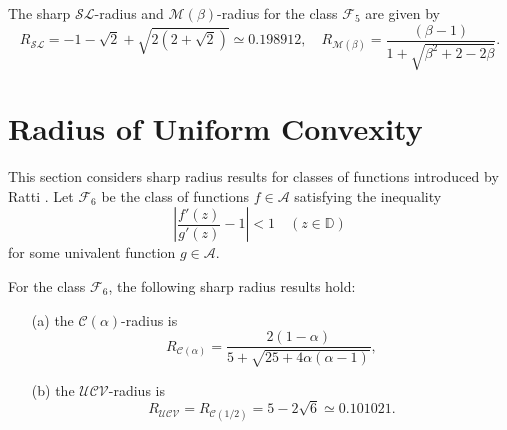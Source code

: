 \documentclass{amsart}
\begin{document}
\begin{conjecture}  \label{i11}The sharp ${\mathcal{SL}}$-radius and  ${\mathcal{M}(\beta)}$-radius for the class $\mathcal{F}_5$ are given by \[R_{\mathcal{SL}}= -1-\sqrt{2}+\sqrt{2 \left(2+\sqrt{2}\right)}\simeq0.198912, \quad R_{\mathcal{M}(\beta)}=\frac{(\beta -1)}{1+\sqrt{\beta ^2+2-2\beta }}.\]
\end{conjecture}

\section{Radius of Uniform Convexity}
This section considers sharp radius results for classes of functions introduced by   Ratti \cite{ratti80}.
Let $\mathcal{F}_6$ be the class of  functions $f\in \mathcal{A}$ satisfying the inequality
\[   \left|\frac{f'(z)}{g'(z)}-1\right|<1\quad ( z\in \mathbb{D})\]
for some   univalent function $g\in \mathcal{A}$.
\begin{theorem}\label{thm1}
For the class $\mathcal{F}_6$,    the following sharp radius results hold:
\begin{enumerate}
\item[(a)]\label{i19} the  ${\mathcal{C}(\alpha)}$-radius  is
\[R_{\mathcal{C}(\alpha)}=\frac{2(1-\alpha)}{5+\sqrt{25+4\alpha(\alpha-1)}},\]
\item[(b)]\label{i20} the   ${\mathcal{UCV}}$-radius  is
\[R_{\mathcal{UCV}}= R_{\mathcal{C}( 1/2)}=5-2\sqrt{6}\simeq0.101021 .\]
\end{enumerate}
\end{theorem}
\end{document}
